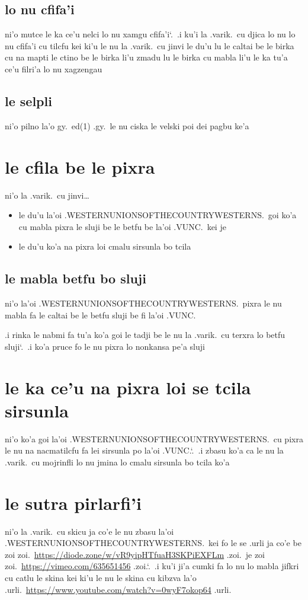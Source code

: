 \documentclass{report}
\newcommand\sds{\spacefactor\sfcode`.\ \space}
\begin{document}
\subsection{lo nu cfifa'i}
ni'o mutce le ka ce'u nelci lo nu xamgu cfifa'i\sds  .i ku'i la .varik.\ cu djica lo nu lo nu cfifa'i cu tilcfu kei ki'u le nu la .varik.\ cu jinvi le du'u lu le caltai be le birka cu na mapti le ctino be le birka li'u zmadu lu le birka cu mabla li'u le ka tu'a ce'u filri'a lo nu xagzengau

\subsection{le selpli}
ni'o pilno la'o gy.\ ed(1) .gy.\ le nu ciska le velski poi dei pagbu ke'a

\section{le cfila be le pixra}
ni'o la .varik.\ cu jinvi\ldots
\begin{itemize}
	\item le du'u la'oi .WESTERNUNIONSOFTHECOUNTRYWESTERNS.\ goi ko'a cu mabla pixra le sluji be le betfu be la'oi .VUNC.\ kei je
	\item le du'u ko'a na pixra loi cmalu sirsunla bo tcila
\end{itemize}

\subsection{le mabla betfu bo sluji}
ni'o la'oi .WESTERNUNIONSOFTHECOUNTRYWESTERNS.\ pixra le nu mabla fa le caltai be le betfu sluji be fi la'oi .VUNC.

.i rinka le nabmi fa tu'a ko'a goi le tadji be le nu la .varik.\ cu terxra lo betfu sluji\sds  .i ko'a pruce fo le nu pixra lo nonkansa pe'a sluji

\section{le ka ce'u na pixra loi se tcila sirsunla}
ni'o ko'a goi la'oi .WESTERNUNIONSOFTHECOUNTRYWESTERNS.\ cu pixra le nu na nacmatilcfu fa lei sirsunla po la'oi .VUNC.\sds  .i zbasu ko'a ca le nu la .varik.\ cu mojrinfli lo nu jmina lo cmalu sirsunla bo tcila ko'a

\section{le sutra pirlarfi'i}
ni'o la .varik.\ cu skicu ja co'e le nu zbasu la'oi .WESTERNUNIONSOFTHECOUNTRYWESTERNS.\ kei fo le se .urli ja co'e be zoi zoi.\ \url{https://diode.zone/w/vR9yipHTfuaH3SKPiEXFLm} .zoi.\ je zoi zoi.\ \url{https://vimeo.com/635651456} .zoi.\sds  .i ku'i ji'a cumki fa lo nu lo mabla jifkri cu catlu le skina kei ki'u le nu le skina cu kibzva la'o .urli.\ \url{https://www.youtube.com/watch?v=0wyF7okop64} .urli.
\end{document}
